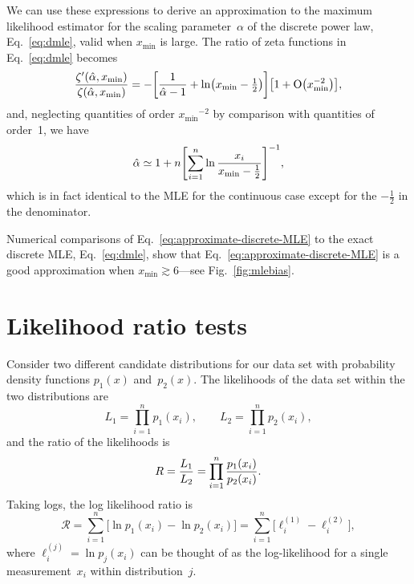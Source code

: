 \documentclass[final]{siamltex}
\newcommand{\half}{\mbox{$\frac12$}}
\newcommand{\Ord}{\mathrm{O}}
\newcommand{\xmin}{\ensuremath{x_{\min}}}
\newcommand{\Like}{\ensuremath{L}}
\begin{document}
\begin{appendix}
We can use these expressions to derive an approximation to the maximum
likelihood estimator for the scaling parameter~$\alpha$ of the discrete
power law, Eq.~\eqref{eq:dmle}, valid when $x_{\min}$ is large.  The ratio
of zeta functions in Eq.~\eqref{eq:dmle} becomes
\begin{equation}
\frac{\zeta'(\hat{\alpha},\xmin)}{\zeta(\hat{\alpha},\xmin)} =
- \biggl[ {1\over\hat{\alpha}-1} + \ln \bigl( \xmin - \half \bigr) \biggr]
\bigl[ 1 + \Ord\bigl(\xmin^{-2}\bigr) \bigr],
\end{equation}
and, neglecting quantities of order $\xmin^{-2}$ by comparison with
quantities of order~1, we have
\begin{equation}
\hat{\alpha} \simeq 1 + n \Biggl[ \sum_{i=1}^n \ln {x_i\over \xmin-\half}
             \Biggr]^{-1},
\label{eq:approximate-discrete-MLE}
\end{equation}
which is in fact identical to the MLE for the continuous case except for
the $-\half$ in the denominator.

Numerical comparisons of Eq.~\eqref{eq:approximate-discrete-MLE} to the
exact discrete MLE, Eq.~\eqref{eq:dmle}, show
that Eq.~\eqref{eq:approximate-discrete-MLE} is a good approximation when
$\xmin\gtrsim6$---see Fig.~\ref{fig:mlebias}.


\section{Likelihood ratio tests}
\label{appendix:lrt}
Consider two different candidate distributions for our data set with
probability density functions $p_1(x)$ and~$p_2(x)$.  The likelihoods of
the data set within the two distributions are
\begin{equation}
\Like_1 = \prod_{i=1}^n p_1(x_i),\qquad
\Like_2 = \prod_{i=1}^n p_2(x_i),
\end{equation}
and the ratio of the likelihoods is
\begin{equation}
R = {\Like_1\over\Like_2} = \prod_{i=1}^n {p_1(x_i)\over p_2(x_i)}.
\end{equation}
Taking logs, the log likelihood ratio is
\begin{equation}
\mathcal{R} = \sum_{i=1}^n \bigl[ \ln p_1(x_i) - \ln p_2(x_i) \bigr]
           = \sum_{i=1}^n \bigl[ \ell_i^{(1)} - \ell_i^{(2)} \bigr],
\label{eq:likeratio}
\end{equation}
where $\ell_i^{(j)} = \ln p_j(x_i)$ can be thought of as the log-likelihood
for a single measurement~$x_i$ within distribution~$j$.


\end{appendix}
\end{document}
